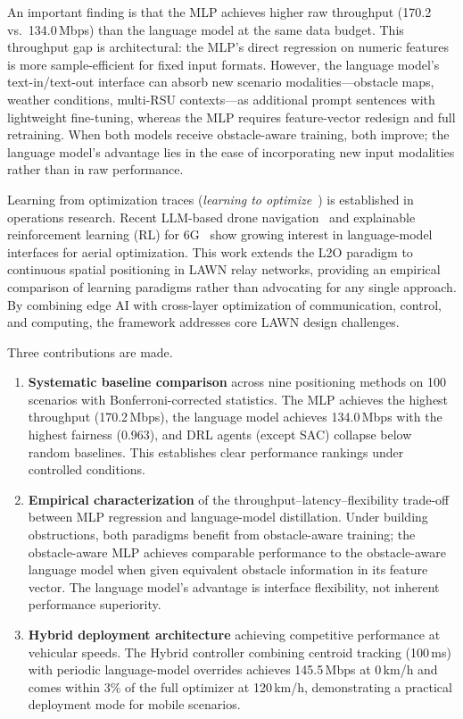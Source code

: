 \documentclass[journal]{IEEEtran}
\begin{document}
An important finding is that the MLP achieves higher raw throughput (170.2 vs.\ 134.0\,Mbps) than the language model at the same data budget. This throughput gap is architectural: the MLP's direct regression on numeric features is more sample-efficient for fixed input formats. However, the language model's text-in/text-out interface can absorb new scenario modalities---obstacle maps, weather conditions, multi-RSU contexts---as additional prompt sentences with lightweight fine-tuning, whereas the MLP requires feature-vector redesign and full retraining. When both models receive obstacle-aware training, both improve; the language model's advantage lies in the ease of incorporating new input modalities rather than in raw performance.

Learning from optimization traces (\emph{learning to optimize}~\cite{bengio2021}) is established in operations research. Recent LLM-based drone navigation~\cite{khan2025llmnav} and explainable reinforcement learning (RL) for 6G~\cite{aranacatania2025xdrl} show growing interest in language-model interfaces for aerial optimization. This work extends the L2O paradigm to continuous spatial positioning in LAWN relay networks, providing an empirical comparison of learning paradigms rather than advocating for any single approach. By combining edge AI with cross-layer optimization of communication, control, and computing, the framework addresses core LAWN design challenges.

Three contributions are made.
\begin{enumerate}
    \item \textbf{Systematic baseline comparison} across nine positioning methods on 100 scenarios with Bonferroni-corrected statistics. The MLP achieves the highest throughput (170.2\,Mbps), the language model achieves 134.0\,Mbps with the highest fairness (0.963), and DRL agents (except SAC) collapse below random baselines. This establishes clear performance rankings under controlled conditions.

    \item \textbf{Empirical characterization} of the throughput--latency--flexibility trade-off between MLP regression and language-model distillation. Under building obstructions, both paradigms benefit from obstacle-aware training; the obstacle-aware MLP achieves comparable performance to the obstacle-aware language model when given equivalent obstacle information in its feature vector. The language model's advantage is interface flexibility, not inherent performance superiority.

    \item \textbf{Hybrid deployment architecture} achieving competitive performance at vehicular speeds. The Hybrid controller combining centroid tracking (100\,ms) with periodic language-model overrides achieves 145.5\,Mbps at 0\,km/h and comes within 3\% of the full optimizer at 120\,km/h, demonstrating a practical deployment mode for mobile scenarios.
\end{enumerate}
\end{document}
